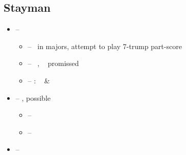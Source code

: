 \subsection{Stayman}
\label{subsec:stayman}

\begin{itemize}
  \item \ctr{2\d} -- \art\ \no\ 
  \begin{itemize}
    \item \ctr{2\h} -- \so\ in majors, attempt to play 7-trump part-score
    \item \ctr{2\nt} -- \nat\ \inv, \no\  promissed
    \item \ctr{3\major} -- : \gf\  \& 
  \end{itemize}
  \item \ctr{2\h} -- , possible 
  \begin{itemize}
    \item \ctr{2\s} -- \inv\ 
    \item \ctr{2\nt} -- \inv\ \no\ 
  \end{itemize}
  \item \ctr{2\s} -- 
\end{itemize}
